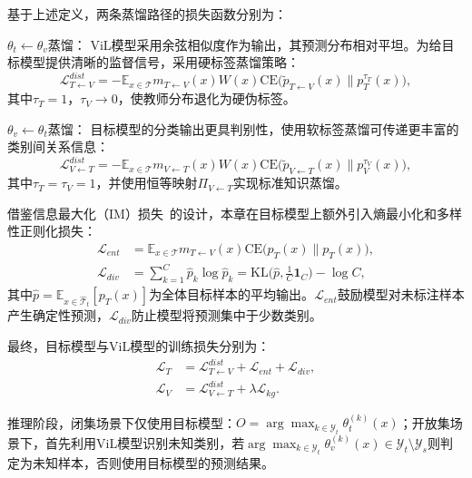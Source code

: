 基于上述定义，两条蒸馏路径的损失函数分别为：

$\theta_t\leftarrow\theta_v$蒸馏： ViL模型采用余弦相似度作为输出，其预测分布相对平坦。为给目标模型提供清晰的监督信号，采用硬标签蒸馏策略：
\begin{equation}
\mathcal{L}_{T\leftarrow V}^{dist} = -\mathbb{E}_{x\in\mathcal{T}}m_{T\leftarrow V}(x)W(x)\mathrm{CE}\big(\tilde{p}_{T\leftarrow V}(x) \| p_T^{\tau_T}(x)\big),
\label{eq:dist_t_from_v}
\end{equation}
其中$\tau_T=1$，$\tau_V\to 0$，使教师分布退化为硬伪标签。

$\theta_v\leftarrow\theta_t$蒸馏： 目标模型的分类输出更具判别性，使用软标签蒸馏可传递更丰富的类别间关系信息：
\begin{equation}
\mathcal{L}_{V\leftarrow T}^{dist} = -\mathbb{E}_{x\in\mathcal{T}}m_{V\leftarrow T}(x)W(x)\mathrm{CE}\big(\tilde{p}_{V\leftarrow T}(x) \| p_V^{\tau_V}(x)\big),
\label{eq:dist_v_from_t}
\end{equation}
其中$\tau_T=\tau_V=1$，并使用恒等映射$\Pi_{V\leftarrow T}$实现标准知识蒸馏。

借鉴信息最大化（IM）损失~\cite{liang2021source}的设计，本章在目标模型上额外引入熵最小化和多样性正则化损失：
\begin{align}
\mathcal{L}_{ent} & = \mathbb{E}_{x\in\mathcal{T}}m_{T\leftarrow V}(x)\mathrm{CE}\big(p_T(x) \| p_T(x)\big), 
\label{eq:loss_ent}\\
\mathcal{L}_{div} & = \sum_{k=1}^{C}\hat{p}_k\log\hat{p}_k = \mathrm{KL}\big(\hat{p},\tfrac{1}{C}\mathbf{1}_C\big) - \log C, 
\label{eq:loss_div}
\end{align}
其中$\hat{p}=\mathbb{E}_{x\in\hat{\mathcal{T}}_t}[p_T(x)]$为全体目标样本的平均输出。$\mathcal{L}_{ent}$鼓励模型对未标注样本产生确定性预测，$\mathcal{L}_{div}$防止模型将预测集中于少数类别。

最终，目标模型与ViL模型的训练损失分别为：
\begin{align}
\mathcal{L}_T &= \mathcal{L}_{T\leftarrow V}^{dist} + \mathcal{L}_{ent} + \mathcal{L}_{div},
\label{eq:loss_T}\\
\mathcal{L}_V &= \mathcal{L}_{V\leftarrow T}^{dist} + \lambda \mathcal{L}_{kg}.
\label{eq:loss_V}
\end{align}

推理阶段，闭集场景下仅使用目标模型：$O=\arg\max_{k\in\mathcal{Y}_t}\theta_t^{(k)}(x)$；开放集场景下，首先利用ViL模型识别未知类别，若$\arg\max_{k\in\mathcal{Y}_t}\theta_v^{(k)}(x)\in\mathcal{Y}_t\setminus\mathcal{Y}_s$则判定为未知样本，否则使用目标模型的预测结果。



